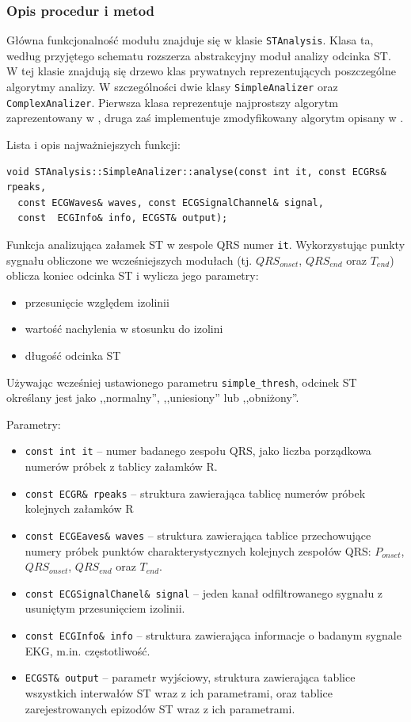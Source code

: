 \documentclass[a4paper, 11pt]{article}
\begin{document}
\subsubsection{Opis procedur i metod}
\label{sec:st_interval:procs}

Główna funkcjonalność modułu znajduje się w klasie \verb|STAnalysis|. Klasa ta,
według przyjętego schematu rozszerza abstrakcyjny moduł analizy odcinka ST. W
tej klasie znajdują się drzewo klas prywatnych reprezentujących poszczególne
algorytmy analizy. W szczególności dwie klasy \verb|SimpleAnalizer| oraz
\verb|ComplexAnalizer|. Pierwsza klasa reprezentuje najprostszy algorytm
zaprezentowany w \cite[p.~155]{AUGUST1}, druga zaś implementuje zmodyfikowany
algorytm opisany w \cite{SHEN1}.

Lista i opis najważniejszych funkcji:

\begin{lstlisting}
void STAnalysis::SimpleAnalizer::analyse(const int it, const ECGRs& rpeaks,
  const ECGWaves& waves, const ECGSignalChannel& signal,
  const  ECGInfo& info, ECGST& output);
\end{lstlisting}

Funkcja analizująca załamek ST w zespole QRS numer \verb|it|. Wykorzystując
punkty sygnału obliczone we wcześniejszych modułach (tj. $QRS_{onset}$,
$QRS_{end}$ oraz $T_{end}$) oblicza koniec odcinka ST i wylicza jego parametry:
\begin{itemize}
  \item przesunięcie względem izolinii
  \item wartość nachylenia w stosunku do izolini
  \item długość odcinka ST
\end{itemize}
Używając wcześniej ustawionego parametru \verb|simple_thresh|, odcinek ST
określany jest jako ,,normalny'', ,,uniesiony'' lub ,,obniżony''.

Parametry:
\begin{itemize}
  \item \verb|const int it| -- numer badanego zespołu QRS, jako liczba
    porządkowa numerów próbek z tablicy załamków R.
  \item \verb|const ECGR& rpeaks| -- struktura zawierająca tablicę numerów
    próbek kolejnych załamków R
  \item \verb|const ECGEaves& waves| -- struktura zawierająca tablice
    przechowujące numery próbek punktów charakterystycznych kolejnych zespołów
    QRS: $P_{onset}$, $QRS_{onset}$, $QRS_{end}$ oraz $T_{end}$.
  \item \verb|const ECGSignalChanel& signal| -- jeden kanał odfiltrowanego
    sygnału z usuniętym przesunięciem izolinii.
  \item \verb|const ECGInfo& info| -- struktura zawierająca informacje o badanym
    sygnale EKG, m.in. częstotliwość.
  \item \verb|ECGST& output| -- parametr wyjściowy, struktura zawierająca
    tablice wszystkich interwałów ST wraz z ich parametrami, oraz tablice
    zarejestrowanych epizodów ST wraz z ich parametrami.
\end{itemize}
\end{document}
